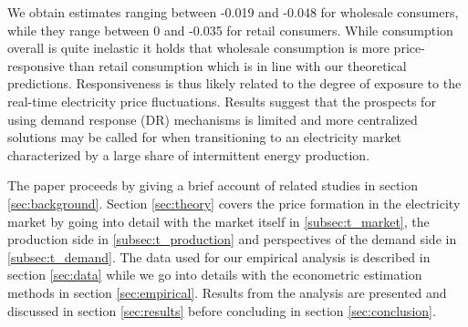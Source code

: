 \par
We obtain estimates ranging between -0.019 and -0.048 for wholesale consumers, while they range between 0 and -0.035 for retail consumers.  While consumption overall is quite inelastic it holds that wholesale consumption is more price-responsive than retail consumption which is in line with our theoretical predictions. Responsiveness is thus likely related to the degree of exposure to the real-time electricity price fluctuations. Results suggest that the prospects for using demand response (DR) mechanisms is limited and more centralized solutions may be called for when transitioning to an electricity market characterized by a large share of intermittent energy production. 
\bigskip \par
The paper proceeds by giving a brief account of related studies in section \ref{sec:background}. Section \ref{sec:theory} covers the price formation in the electricity market by going into detail with the market itself in \ref{subsec:t_market}, the production side in \ref{subsec:t_production} and perspectives of the demand side in \ref{subsec:t_demand}. The data used for our empirical analysis is described in section \ref{sec:data} while we go into details with the econometric estimation methods in section \ref{sec:empirical}. Results from the analysis are presented and discussed in section \ref{sec:results} before concluding in section \ref{sec:conclusion}.
